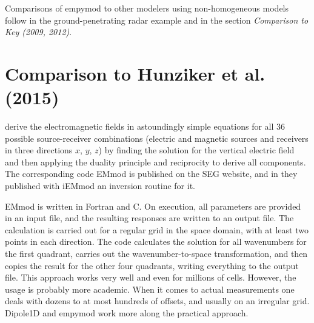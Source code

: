 \documentclass[manuscript,revised]{geophysics}
\begin{document}
Comparisons of empymod to other modelers using non-homogeneous models follow in
the ground-penetrating radar example and in the section \emph{Comparison to Key
(2009, 2012)}.

\section{Comparison to Hunziker et al. (2015)}

\cite{GEO.15.Hunziker} derive the electromagnetic fields in astoundingly simple
equations for all 36 possible source-receiver combinations (electric and
magnetic sources and receivers in three directions $x$, $y$, $z$) by finding
the solution for the vertical electric field and then applying the duality
principle and reciprocity to derive all components. The corresponding code
EMmod is published on the SEG website, and in \cite{GEO.16.Hunziker} they
published with iEMmod an inversion routine for it.

EMmod is written in Fortran and C. On execution, all parameters are provided in
an input file, and the resulting responses are written to an output file. The
calculation is carried out for a regular grid in the space domain, with at
least two points in each direction. The code calculates the solution for all
wavenumbers for the first quadrant, carries out the wavenumber-to-space
transformation, and then copies the result for the other four quadrants,
writing everything to the output file. This approach works very well and even
for millions of cells. However, the usage is probably more academic. When it
comes to actual measurements one deals with dozens to at most hundreds of
offsets, and usually on an irregular grid. Dipole1D and empymod work more along
the practical approach.
\end{document}
